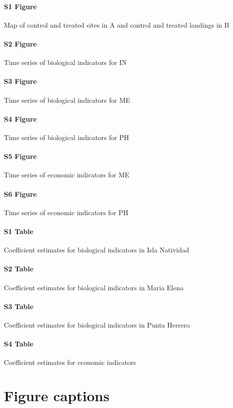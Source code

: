 \documentclass{frontiersSCNS}
\theoremstyle{definition}
\theoremstyle{definition}
\theoremstyle{definition}
\theoremstyle{remark}
\begin{document}
\paragraph*{S1 Figure}
\label{S1_Figure}

Map of control and treated sites in A and control and treated landings
in B

\paragraph*{S2 Figure}
\label{S2_Figure}

Time series of biological indicators for IN

\paragraph*{S3 Figure}
\label{S3_Figure}

Time series of biological indicators for ME

\paragraph*{S4 Figure}
\label{S4_Figure}

Time series of biological indicators for PH

\paragraph*{S5 Figure}
\label{S5_Figure}

Time series of economic indicators for ME

\paragraph*{S6 Figure}
\label{S6_Figure}

Time series of economic indicators for PH

\paragraph*{S1 Table}
\label{S1_Table}

Coefficient estimates for biological indicators in Isla Natividad

\paragraph*{S2 Table}
\label{S2_Table}

Coefficient estimates for biological indicators in Maria Elena

\paragraph*{S3 Table}
\label{S3_Table}

Coefficient estimates for biological indicators in Punta Herrero

\paragraph*{S4 Table}
\label{S4_Table}

Coefficient estimates for economic indicators



\section*{Figure captions}
\end{document}
